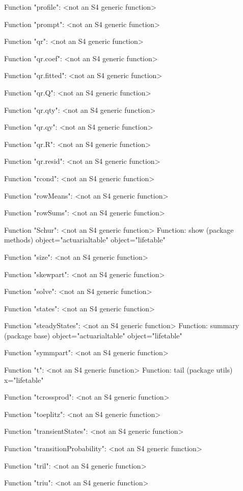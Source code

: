 \documentclass[nojss]{jss}
\begin{document}
\begin{Schunk}
\begin{Soutput}
Function "profile":
 <not an S4 generic function>

Function "prompt":
 <not an S4 generic function>

Function "qr":
 <not an S4 generic function>

Function "qr.coef":
 <not an S4 generic function>

Function "qr.fitted":
 <not an S4 generic function>

Function "qr.Q":
 <not an S4 generic function>

Function "qr.qty":
 <not an S4 generic function>

Function "qr.qy":
 <not an S4 generic function>

Function "qr.R":
 <not an S4 generic function>

Function "qr.resid":
 <not an S4 generic function>

Function "rcond":
 <not an S4 generic function>

Function "rowMeans":
 <not an S4 generic function>

Function "rowSums":
 <not an S4 generic function>

Function "Schur":
 <not an S4 generic function>
Function: show (package methods)
object="actuarialtable"
object="lifetable"


Function "size":
 <not an S4 generic function>

Function "skewpart":
 <not an S4 generic function>

Function "solve":
 <not an S4 generic function>

Function "states":
 <not an S4 generic function>

Function "steadyStates":
 <not an S4 generic function>
Function: summary (package base)
object="actuarialtable"
object="lifetable"


Function "symmpart":
 <not an S4 generic function>

Function "t":
 <not an S4 generic function>
Function: tail (package utils)
x="lifetable"


Function "tcrossprod":
 <not an S4 generic function>

Function "toeplitz":
 <not an S4 generic function>

Function "transientStates":
 <not an S4 generic function>

Function "transitionProbability":
 <not an S4 generic function>

Function "tril":
 <not an S4 generic function>

Function "triu":
 <not an S4 generic function>


\end{Soutput}
\end{Schunk}
\end{document}
